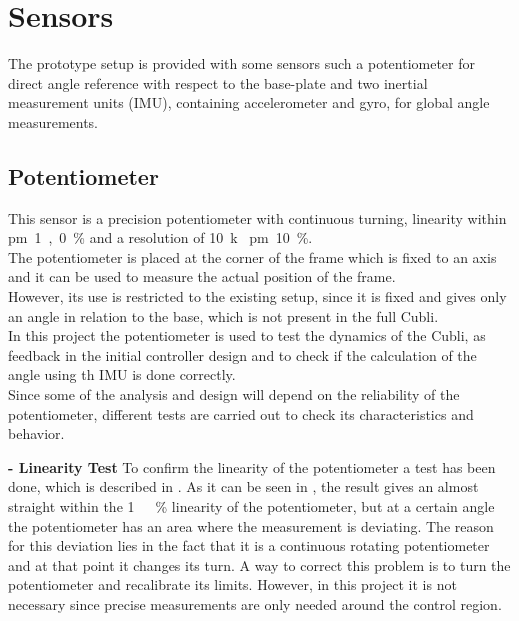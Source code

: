 \section{Sensors}
\label{sec:Sensors}
The prototype setup is provided with some sensors such a potentiometer for direct angle reference with respect to the base-plate and two inertial measurement units (IMU), containing accelerometer and gyro, for global angle measurements.

\subsection{Potentiometer}
This sensor is a precision potentiometer with continuous turning, linearity within \si{\pm1,0\%} and a resolution of \SI{10}{k\Omega} \si{\pm10\%}.\\
The potentiometer is placed at the corner of the frame which is fixed to an axis and it can be used to measure the actual position of the frame.\\
However, its use is restricted to the existing setup, since it is fixed and gives only an angle in relation to the base, which is not present in the full Cubli.\\
In this project the potentiometer is used to test the dynamics of the Cubli, as feedback in the initial controller design and to check if the calculation of the angle using th IMU is done correctly.\\
Since some of the analysis and design will depend on the reliability of the potentiometer, different tests are carried out to check its characteristics and behavior.
%

\textbf{- Linearity Test}
To confirm the linearity of the potentiometer a test has been done, which is described in . As it can be seen in , the result gives an almost straight within the \si{1\ \%} linearity of the potentiometer, but at a certain angle the potentiometer has an area where the measurement is deviating. The reason for this deviation lies in the fact that it is a continuous rotating potentiometer and at that point it changes its turn. A way to correct this problem is to turn the potentiometer and recalibrate its limits. However, in this project it is not necessary since precise measurements are only needed around the control region.


